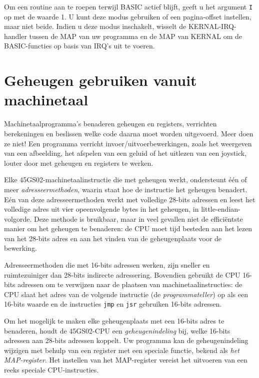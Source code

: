 
Om een routine aan te roepen terwijl BASIC actief blijft, geeft u het argument \texttt{I} op met de waarde 1. U kunt deze modus gebruiken of een pagina-offset instellen, maar niet beide. Indien u deze modus inschakelt, wisselt de KERNAL-IRQ-handler tussen de MAP van uw programma en de MAP van KERNAL om de BASIC-functies op basis van IRQ's uit te voeren.



\newpage
\section{Geheugen gebruiken vanuit machinetaal}

Machinetaalprogramma's benaderen geheugen en registers, verrichten berekeningen en beslissen welke code daarna moet worden uitgevoerd. Meer doen ze niet! Een programma verricht invoer/uitvoerbewerkingen, zoals het weergeven van een afbeelding, het afspelen van een geluid of het uitlezen van een joystick, louter door met geheugen en registers te werken.

Elke 45GS02-machinetaalinstructie die met geheugen werkt, ondersteunt één of meer {\em adresseermethoden}, waarin staat hoe de instructie het geheugen benadert. Eén van deze adresseermethoden werkt met volledige 28-bits adressen en leest het volledige adres uit vier opeenvolgende bytes in het geheugen, in little-endian-volgorde. Deze methode is bruikbaar, maar in veel gevallen niet de efficiëntste manier om het geheugen te benaderen: de CPU moet tijd besteden aan het lezen van het 28-bits adres en aan het vinden van de geheugenplaats voor de bewerking.

Adresseermethoden die met 16-bits adressen werken, zijn sneller en ruimtezuiniger dan 28-bits indirecte adressering. Bovendien gebruikt de CPU 16-bits adressen om te verwijzen naar de plaatsen van machinetaalinstructies: de CPU slaat het adres van de volgende instructie (de {\em programmateller}) op als een 16-bits waarde en de instructies \texttt{jmp} en \texttt{jsr} gebruiken 16-bits adressen.

Om het mogelijk te maken elke geheugenplaats met een 16-bits adres te benaderen, houdt de 45GS02-CPU een {\em geheugenindeling} bij, welke 16-bits adressen aan 28-bits adressen koppelt. Uw programma kan de geheugenindeling wijzigen met behulp van een register met een speciale functie, bekend als {\em het MAP-register}. Het instellen van het MAP-register vereist het uitvoeren van een reeks speciale CPU-instructies.

